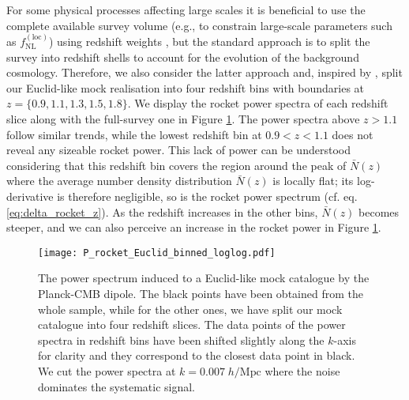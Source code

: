 \documentclass[a4paper,11pt]{article}
\begin{document}
For some physical processes affecting large scales it is beneficial to use the complete available survey volume (e.g.,  to constrain large-scale parameters such as $f_\mathrm{NL}^\mathrm{(loc)}$) using redshift weights \cite{Zhu:2014ica, Ruggeri:2016mac,Mueller:2017pop,Ruggeri:2017rza,Ruggeri:2020cus}, but the standard approach is to split the survey into redshift shells to account for the evolution of the background cosmology. Therefore, we also consider the latter approach and, inspired by \cite{Blanchard:2019oqi}, split our Euclid-like mock realisation into four redshift bins with boundaries at $z=\lbrace 0.9, 1.1, 1.3, 1.5, 1.8\rbrace$. We display the rocket power spectra of each redshift slice along with the full-survey one in Figure \ref{fig:P_rocket_binned}. The power spectra above $z>1.1$ follow similar trends, while the lowest redshift bin at $0.9<z<1.1$ does not reveal any sizeable rocket power. This lack of power can be understood considering that this redshift bin covers the region around the peak of $\bar N(z)$ where the average number density distribution $\bar N(z)$ is locally flat; its log-derivative is therefore negligible, so is the rocket power spectrum (cf. eq. \eqref{eq:delta_rocket_z}). As the redshift increases in the other bins, $\bar N(z)$ becomes steeper, and we can also perceive an increase in the rocket power in Figure \ref{fig:P_rocket_binned}.

\begin{figure}
    \centering
    \texttt{[image: P\_rocket\_Euclid\_binned\_loglog.pdf]}
    \caption{The power spectrum induced to a Euclid-like mock catalogue by the Planck-CMB dipole. The black points have been obtained from the whole sample, while for the other ones, we have split our mock catalogue into four redshift slices. The data points of the power spectra in redshift bins have been shifted slightly along the $k$-axis for clarity and they correspond to the closest data point in black. We cut the power spectra at $k = 0.007\;h/\mathrm{Mpc}$ where the noise dominates the systematic signal.}
    \label{fig:P_rocket_binned}
\end{figure}
\end{document}
